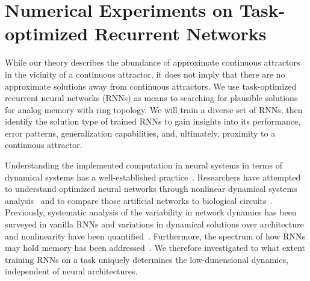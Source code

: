 \documentclass{article} %
\newcommand{\mpcomment}[1]{\textcolor{mpcolor}{(#1)}}
\newcounter{ct}
\theoremstyle{definition}
\theoremstyle{remark}
\begin{document}
\section{Numerical Experiments on Task-optimized Recurrent Networks}\label{sec:experiments}

While our theory describes the abundance of approximate continuous attractors in the vicinity of a continuous attractor, it does not imply that there are no approximate solutions away from continuous attractors.
We use task-optimized recurrent neural networks (RNNs) as means to searching for plausible solutions for analog memory with ring topology.
We will train a diverse set of RNNs, then identify the solution type of trained RNNs to gain insights into its performance, error patterns, generalization capabilities, and, ultimately, proximity to a continuous attractor.


Understanding the implemented computation in neural systems in terms of dynamical systems has a well-established practice~\citep{seung1996,sompolinsky1988}.
Researchers have attempted to understand optimized neural networks through nonlinear dynamical systems analysis~\citep{sussillo2013blackbox,sussillo2014,barak2013,driscoll2022,maheswaranathan2019universality,cueva2019headdirection,cueva2021continuous} and to compare those artificial networks to biological circuits~\citep{mante2013context,remington2018flexible,ghazizadeh2021slow}.
% 
Previously, systematic analysis of the variability in network dynamics has been surveyed in vanilla RNNs and variations in dynamical solutions over architecture and nonlinearity have been quantified~\citep{sussillo2013blackbox,mante2013context,yang2019task,maheswaranathan2019universality,driscoll2022}.
Furthermore, the spectrum of how RNNs may hold memory has been addressed~\citep{orhan2019diverse}.
We therefore investigated to what extent training RNNs on a task uniquely determines the low-dimensional dynamics, independent of neural architectures.
\end{document}
